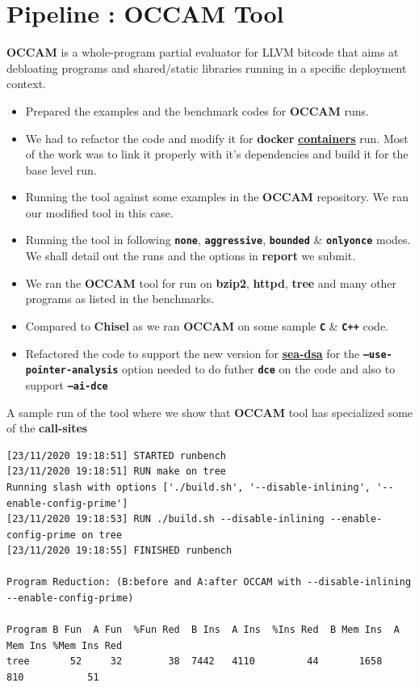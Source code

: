 \documentclass{article} %
\begin{document}
\section*{\color{darkmidnightblue} Pipeline : OCCAM Tool} 
\textbf{OCCAM} is a whole-program partial evaluator for LLVM bitcode that aims at debloating programs and shared/static libraries running in a specific deployment context.
\begin{itemize}
	\item Prepared the examples and the benchmark codes for \textbf{OCCAM} runs. 
	\item We had to refactor the code and modify it for \textbf{docker} \textbf{\href{https://hub.docker.com/r/prodrelworks/occam10}{containers}} run. Most of the work was to link it properly with it's dependencies and build it for the base level run. 
	\item Running the tool against some examples in the \textbf{OCCAM} repository. We ran our modified tool in this case.
	\item Running the tool in following \textbf{\texttt{none}}, \textbf{\texttt{aggressive}}, \textbf{\texttt{bounded}} \& \textbf{\texttt{onlyonce}} modes. 
	We shall detail out the runs and the options in \textbf{report} we submit.  
	\item We ran the \textbf{OCCAM} tool for run on \textbf{bzip2}, \textbf{httpd}, \textbf{tree} and many other programs as listed in the benchmarks.
	\item Compared to \textbf{Chisel} as we ran \textbf{OCCAM} on some sample \textbf{\texttt{C}} \& \textbf{\texttt{C++}} code.
	\item Refactored the code to support the new version for \textbf{\href{https://github.com/seahorn/sea-dsa}{sea-dsa}} for the \textbf{\texttt{--use-pointer-analysis}} option needed to do futher \textbf{\texttt{dce}} on the code and also to support \textbf{\texttt{--ai-dce}}
\end{itemize}

A sample run of the tool where we show that \textbf{OCCAM} tool has specialized some of the \textbf{\color{ao(english)} call-sites} 
\begin{lstlisting}
[23/11/2020 19:18:51] STARTED runbench
[23/11/2020 19:18:51] RUN make on tree
Running slash with options ['./build.sh', '--disable-inlining', '--enable-config-prime']
[23/11/2020 19:18:53] RUN ./build.sh --disable-inlining --enable-config-prime on tree
[23/11/2020 19:18:55] FINISHED runbench

Program Reduction: (B:before and A:after OCCAM with --disable-inlining --enable-config-prime)

Program B Fun  A Fun  %Fun Red  B Ins  A Ins  %Ins Red  B Mem Ins  A Mem Ins %Mem Ins Red
tree       52     32        38  7442   4110         44       1658        810           51
\end{lstlisting}
\end{document}
